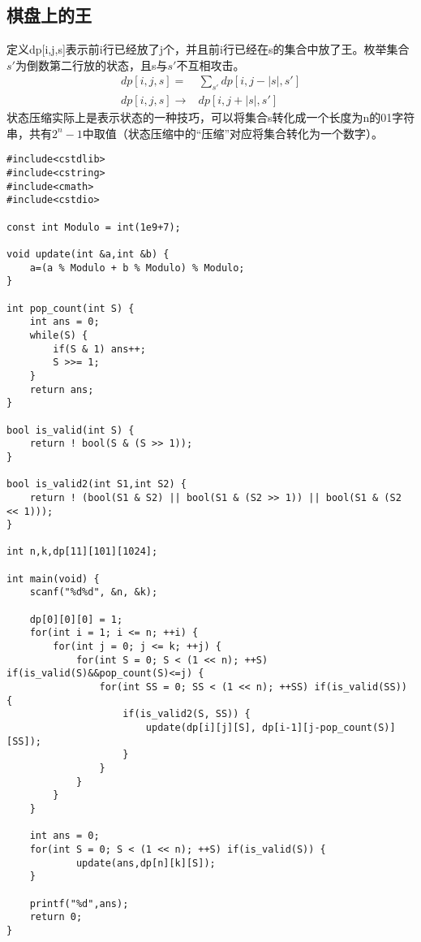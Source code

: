 \subsection{棋盘上的王}
定义dp[i,j,s]表示前i行已经放了j个，并且前i行已经在s的集合中放了王。枚举集合$s'$为倒数第二行放的状态，且s与$s'$不互相攻击。
\begin{equation*}
    \begin{aligned}
        dp[i,j,s]=&\sum_{s'}dp[i,j-|s|,s']\\
        dp[i,j,s]\to& dp[i,j+|s|,s']
    \end{aligned}
\end{equation*}
状态压缩实际上是表示状态的一种技巧，可以将集合s转化成一个长度为n的01字符串，共有$2^n-1$中取值（状态压缩中的“压缩”对应将集合转化为一个数字）。

\begin{verbatim}
#include<cstdlib>
#include<cstring>
#include<cmath>
#include<cstdio>

const int Modulo = int(1e9+7);

void update(int &a,int &b) {
    a=(a % Modulo + b % Modulo) % Modulo;
}

int pop_count(int S) {
    int ans = 0;
    while(S) {
        if(S & 1) ans++;
        S >>= 1;
    }
    return ans;
}

bool is_valid(int S) {
    return ! bool(S & (S >> 1));
}

bool is_valid2(int S1,int S2) {
    return ! (bool(S1 & S2) || bool(S1 & (S2 >> 1)) || bool(S1 & (S2 << 1)));
}

int n,k,dp[11][101][1024];

int main(void) {
    scanf("%d%d", &n, &k);

    dp[0][0][0] = 1;
    for(int i = 1; i <= n; ++i) {
        for(int j = 0; j <= k; ++j) {
            for(int S = 0; S < (1 << n); ++S) if(is_valid(S)&&pop_count(S)<=j) {
                for(int SS = 0; SS < (1 << n); ++SS) if(is_valid(SS)) {
                    if(is_valid2(S, SS)) {
                        update(dp[i][j][S], dp[i-1][j-pop_count(S)][SS]);
                    }
                }
            }
        }
    }

    int ans = 0;
    for(int S = 0; S < (1 << n); ++S) if(is_valid(S)) {
            update(ans,dp[n][k][S]);
    }

    printf("%d",ans);
    return 0;
}
\end{verbatim}

\iffalse
\subsubsection{特殊序列}
\fi

